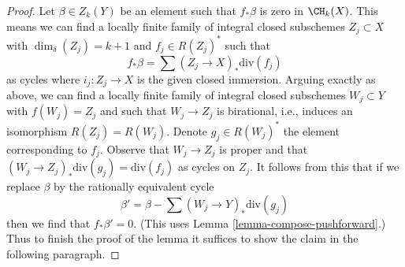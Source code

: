 \begin{proof}
\medskip\noindent
Let $\beta \in Z_k(Y)$ be an element such that $f_*\beta$ is zero in
$\CH_k(X)$. This means we can find a locally finite family of
integral closed subschemes $Z_j \subset X$ with $\dim_\delta(Z_j) = k + 1$
and $f_j \in R(Z_j)^*$ such that
$$
f_*\beta = \sum (Z_j \to X)_*\text{div}(f_j)
$$
as cycles where $i_j : Z_j \to X$ is the given closed immersion.
Arguing exactly as above, we can find a locally finite
family of integral closed subschemes $W_j \subset Y$
with $f(W_j) = Z_j$ and such that $W_j \to Z_j$ is birational, i.e.,
induces an isomorphism $R(Z_j) = R(W_j)$. Denote $g_j \in R(W_j)^*$
the element corresponding to $f_j$. Observe that $W_j \to Z_j$
is proper and that $(W_j \to Z_j)_*\text{div}(g_j) = \text{div}(f_j)$
as cycles on $Z_j$. It follows from this that if we replace
$\beta$ by the rationally equivalent cycle
$$
\beta' = \beta - \sum (W_j \to Y)_*\text{div}(g_j)
$$
then we find that $f_*\beta' = 0$.
(This uses Lemma \ref{lemma-compose-pushforward}.)
Thus to finish the proof
of the lemma it suffices to show the claim in the following paragraph.


\end{proof}
